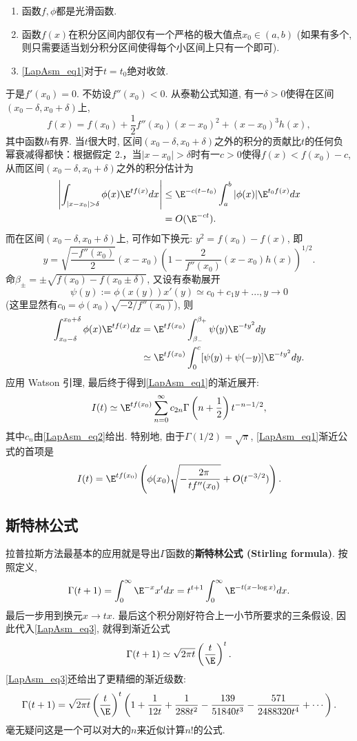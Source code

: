 \begin{enumerate}
\item 函数$f,\phi$都是光滑函数.

\item 函数$f(x)$在积分区间内部仅有一个严格的极大值点$x_0\in(a,b)$ (如果有多个, 则只需要适当划分积分区间使得每个小区间上只有一个即可). 

\item \autoref{LapAsm_eq1}对于$t=t_0$绝对收敛.
\end{enumerate}

于是$f'(x_0)=0$. 不妨设$f''(x_0)<0$. 从泰勒公式知道, 有一$\delta>0$使得在区间$(x_0-\delta,x_0+\delta)$上, 
$$
f(x)=f(x_0)+\frac{1}{2}f''(x_0)(x-x_0)^2+(x-x_0)^3h(x),
$$
其中函数$h$有界. 当$t$很大时, 区间$(x_0-\delta,x_0+\delta)$之外的积分的贡献比$t$的任何负幂衰减得都快：根据假定 2.，当$|x-x_0|>\delta$时有一$c>0$使得$f(x)<f(x_0)-c$, 从而区间$(x_0-\delta,x_0+\delta)$之外的积分估计为
$$
\begin{aligned}
\left|\int_{|x-x_0|>\delta}\phi(x)\E^{tf(x)}dx\right|
&\leq \E^{-c(t-t_0)}\int_a^b|\phi(x)|\E^{t_0f(x)}dx\\
&=O(\E^{-ct}).
\end{aligned}
$$
而在区间$(x_0-\delta,x_0+\delta)$上, 可作如下换元: $y^2=f(x_0)-f(x)$, 即
$$
y=\sqrt{\frac{-f''(x_0)}{2}}(x-x_0)\left(1-\frac{2}{f''(x_0)}(x-x_0)h(x)\right)^{1/2}.
$$
命$\beta_{\pm}=\pm\sqrt{f(x_0)-f(x_0\pm\delta)}$, 又设有泰勒展开
\begin{equation}\label{LapAsm_eq2}
\psi(y):=\phi(x(y))x'(y)\simeq c_0+c_1y+...,y\to 0
\end{equation}
(这里显然有$c_0=\phi(x_0)\sqrt{-2/f''(x_0)}$), 则
$$
\begin{aligned}
\int_{x_0-\delta}^{x_0+\delta}\phi(x)\E^{tf(x)}dx
&=\E^{tf(x_0)}\int_{\beta_{-}}^{\beta_+}\psi(y)\E^{-ty^2}dy\\
&\simeq\E^{tf(x_0)}\int_{0}^{c}[\psi(y)+\psi(-y)]\E^{-ty^2}dy.
\end{aligned}
$$
应用 Watson 引理, 最后终于得到\autoref{LapAsm_eq1}的渐近展开:
\begin{equation}\label{LapAsm_eq3}
I(t)\simeq \E^{tf(x_0)}\sum_{n=0}^\infty c_{2n}\Gamma\left(n+\frac{1}{2}\right)t^{-n-1/2},
\end{equation}
其中$c_n$由\autoref{LapAsm_eq2}给出. 特别地, 由于$\Gamma(1/2)=\sqrt{\pi}$, \autoref{LapAsm_eq1}渐近公式的首项是
$$
I(t)=\E^{tf(x_0)}\left(\phi(x_0)\sqrt{-\frac{2\pi}{tf''(x_0)}}+O(t^{-3/2})\right).
$$

\subsection{斯特林公式}
拉普拉斯方法最基本的应用就是导出$\Gamma$函数的\textbf{斯特林公式 (Stirling formula)}. 按照定义,
$$
\Gamma(t+1)
=\int_0^\infty \E^{-x}x^tdx
=t^{t+1}\int_0^\infty \E^{-t(x-\log x)}dx.
$$
最后一步用到换元$x\to tx$. 最后这个积分刚好符合上一小节所要求的三条假设, 因此代入\autoref{LapAsm_eq3}, 就得到渐近公式
$$
\Gamma(t+1)\simeq\sqrt{2\pi t}\left(\frac{t}{\E}\right)^t.
$$
\autoref{LapAsm_eq3}还给出了更精细的渐近级数:
$$
  \Gamma(t+1)
  =\sqrt{2\pi t}\left({t\over \E}\right)^t
  \left(
   1
   +{1\over12t}
   +{1\over288t^2}
   -{139\over51840t^3}
   -{571\over2488320t^4}
   + \cdots
  \right).
$$
毫无疑问这是一个可以对大的$n$来近似计算$n!$的公式.
